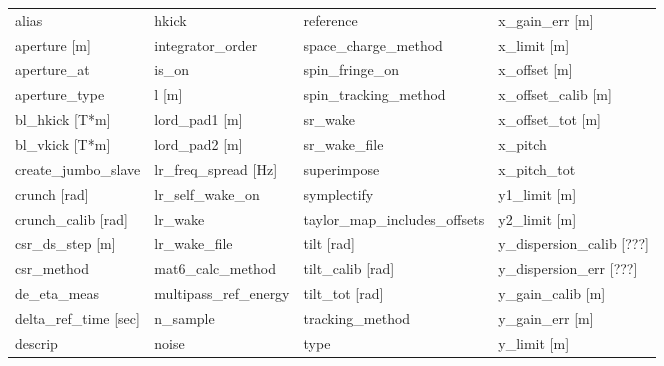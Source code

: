  \begin{tabular}{llll} \toprule
alias                            & hkick                            & reference                        & x_gain_err [m]                   \\
aperture [m]                     & integrator_order                 & space_charge_method              & x_limit [m]                      \\
aperture_at                      & is_on                            & spin_fringe_on                   & x_offset [m]                     \\
aperture_type                    & l [m]                            & spin_tracking_method             & x_offset_calib [m]               \\
bl_hkick [T*m]                   & lord_pad1 [m]                    & sr_wake                          & x_offset_tot [m]                 \\
bl_vkick [T*m]                   & lord_pad2 [m]                    & sr_wake_file                     & x_pitch                          \\
create_jumbo_slave               & lr_freq_spread [Hz]              & superimpose                      & x_pitch_tot                      \\
crunch [rad]                     & lr_self_wake_on                  & symplectify                      & y1_limit [m]                     \\
crunch_calib [rad]               & lr_wake                          & taylor_map_includes_offsets      & y2_limit [m]                     \\
csr_ds_step [m]                  & lr_wake_file                     & tilt [rad]                       & y_dispersion_calib [???]         \\
csr_method                       & mat6_calc_method                 & tilt_calib [rad]                 & y_dispersion_err [???]           \\
de_eta_meas                      & multipass_ref_energy             & tilt_tot [rad]                   & y_gain_calib [m]                 \\
delta_ref_time [sec]             & n_sample                         & tracking_method                  & y_gain_err [m]                   \\
descrip                          & noise                            & type                             & y_limit [m]                      \\

\end{tabular}
